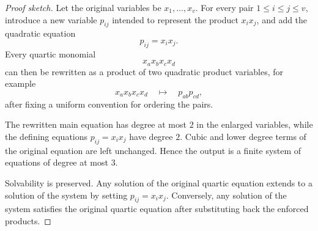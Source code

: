 \documentclass[10pt,a4paper]{amsart}
\begin{document}
\begin{proof}[Proof sketch]
	Let the original variables be $x_1,\ldots,x_v$. For every pair
	$1\le i\le j\le v$, introduce a new variable $p_{ij}$ intended to represent the product $x_i x_j$, and add the quadratic equation
	\begin{equation}
		p_{ij}=x_i x_j.
	\end{equation}
	Every quartic monomial
	\begin{equation}
		x_a x_b x_c x_d
	\end{equation}
	can then be rewritten as a product of two quadratic product variables, for example
	\begin{equation}
		x_a x_b x_c x_d
		\quad\longmapsto\quad
		p_{ab}p_{cd},
	\end{equation}
	after fixing a uniform convention for ordering the pairs.

	The rewritten main equation has degree at most $2$ in the enlarged variables, while the defining equations $p_{ij}=x_i x_j$ have degree $2$. Cubic and lower degree terms of the original equation are left unchanged. Hence the output is a finite system of equations of degree at most $3$.

	Solvability is preserved. Any solution of the original quartic equation extends to a solution of the system by setting $p_{ij}=x_i x_j$. Conversely, any solution of the system satisfies the original quartic equation after substituting back the enforced products.
\end{proof}
\end{document}
